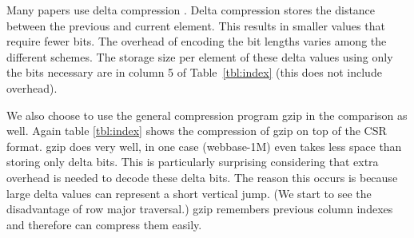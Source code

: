 Many papers use delta compression \cite{prelim:townsend, prelim:kourtis}. Delta compression stores the distance between the previous and current element. This results in smaller values that require fewer bits. The overhead of encoding the bit lengths varies among the different schemes. The storage size per element of these delta values using only the bits necessary are in column 5 of Table~\ref{tbl:index} (this does not include overhead).\par
We also choose to use the general compression program gzip in the comparison as well. Again table \ref{tbl:index} shows the compression of gzip on top of the CSR format. gzip does very well, in one case (webbase-1M) even takes less space than storing only delta bits. This is particularly surprising considering that extra overhead is needed to decode these delta bits. The reason this occurs is because large delta values can represent a short vertical jump. (We start to see the disadvantage of row major traversal.) gzip remembers previous column indexes and therefore can compress them easily.\par
